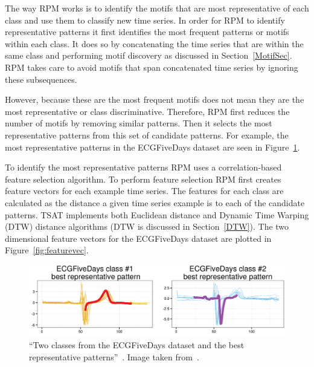 \documentclass[letterpaper, 12pt]{article}
\begin{document}
The way RPM works is to identify the motifs that are most representative of each class and use them to classify new time series.  In order for RPM to identify representative patterns it first identifies the most frequent patterns or motifs within each class.  It does so by concatenating the time series that are within the same class and performing motif discovery as discussed in Section~\ref{MotifSec}.  RPM takes care to avoid motifs that span concatenated time series by ignoring these subsequences.

However, because these are the most frequent motifs does not mean they are the most representative or class discriminative.  Therefore, RPM first reduces the number of motifs by removing similar patterns.  Then it selects the most representative patterns from this set of candidate patterns.  For example, the most representative patterns in the ECGFiveDays dataset are seen in Figure~\ref{fig:representativepatterns}.

To identify the most representative patterns RPM uses a correlation-based feature selection algorithm. To perform feature selection RPM first creates feature vectors for each example time series. The features for each class are calculated as the distance a given time series example is to each of the candidate patterns.  TSAT implements both Euclidean distance and Dynamic Time Warping (DTW) distance algorithms (DTW is discussed in Section~\ref{DTW}).  The two dimensional feature vectors for the ECGFiveDays dataset are plotted in Figure~\ref{fig:featurevec}.

\begin{figure}[H]
	\centering
	\includegraphics[width=.7\textwidth]{pictures/representativepatterns}
	\caption{``Two classes from the ECGFiveDays dataset and the best representative patterns''~\cite{wang2016rpm}.  Image taken from~\cite{wang2016rpm}.}
	\label{fig:representativepatterns}
\end{figure}
\end{document}
